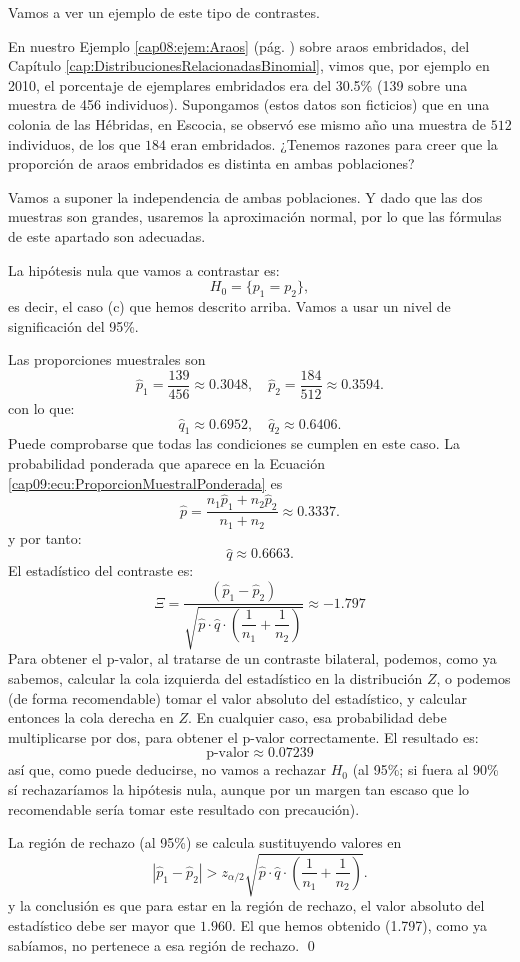 Vamos a ver un ejemplo de este tipo de contrastes.
\begin{ejemplo}
\label{cap09:ejem:ContrasteDiferenciaProporciones}
En nuestro Ejemplo \ref{cap08:ejem:Araos} (pág. \pageref{cap08:ejem:Araos}) sobre araos embridados, del Capítulo \ref{cap:DistribucionesRelacionadasBinomial}, vimos que, por ejemplo en 2010, el porcentaje de ejemplares embridados era del 30.5\% (139 sobre una muestra de 456 individuos). Supongamos (estos datos son ficticios) que en una colonia de las Hébridas, en Escocia, se observó ese mismo año una muestra de $512$ individuos, de los que $184$ eran embridados. ¿Tenemos razones para creer que la proporción de araos embridados es distinta en ambas poblaciones?

Vamos a suponer la independencia de ambas poblaciones. Y dado que las dos muestras son grandes, usaremos la aproximación normal, por lo que las fórmulas de este apartado son adecuadas.

La hipótesis nula que vamos a contrastar es:
\[H_0=\{p_1 = p_2\},\]
es decir, el caso (c) que hemos descrito arriba. Vamos a usar un nivel de significación del 95\%.

Las proporciones muestrales son
\[\hat p_1 = \dfrac{139}{456}\approx 0.3048, \quad \hat p_2 = \dfrac{184}{512}\approx 0.3594.\]
con lo que:
\[\hat q_1 \approx 0.6952, \quad \hat q_2 \approx 0.6406.\]
Puede comprobarse que todas las condiciones se cumplen en este caso. La probabilidad ponderada que aparece en la Ecuación \ref{cap09:ecu:ProporcionMuestralPonderada} es
    \[
        \hat p=\dfrac{n_1\hat p_1+n_2\hat p_2}{n_1+n_2}\approx 0.3337.
    \]
    y por tanto:
    \[\hat q\approx 0.6663.\]
El estadístico del contraste es:
    \[
    \Xi=\dfrac{\left(\hat p_1-\hat p_2\right)}{\sqrt{\hat p\cdot \hat q
    \cdot\left(\dfrac{1}{n_1}+\dfrac{1}{n_2}\right)}}
    \approx -1.797
    \]
Para obtener el p-valor, al tratarse de un contraste bilateral, podemos, como ya sabemos, calcular
la cola izquierda del estadístico en la distribución $Z$, o podemos (de forma recomendable) tomar
el valor absoluto del estadístico, y calcular entonces la cola derecha en $Z$. En cualquier caso,
esa probabilidad debe multiplicarse por dos, para obtener el p-valor correctamente. El resultado
es:
\[\mbox{p-valor}\approx 0.07239\]
así que, como puede deducirse, no vamos a rechazar $H_0$ (al 95\%; si fuera al 90\% sí rechazaríamos la hipótesis nula, aunque por un margen tan escaso que lo recomendable sería tomar este resultado con precaución).

La región de rechazo (al 95\%) se calcula sustituyendo valores en
    \[\left|\hat p_1-\hat p_2\right|>z_{\alpha/2}\sqrt{\hat p\cdot \hat q
        \cdot\left(\dfrac{1}{n_1}+\dfrac{1}{n_2}\right)}.\]
y la conclusión es que para estar en la región de rechazo, el valor absoluto del estadístico debe ser mayor que $1.960$. El que hemos obtenido (1.797), como ya sabíamos, no pertenece a esa región de rechazo.
\qed
\end{ejemplo}


